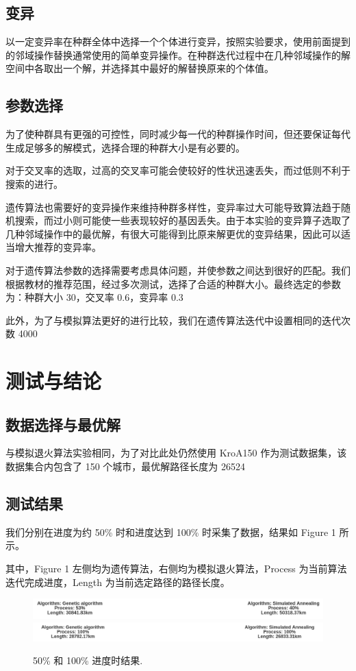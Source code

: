 \subsection{变异}

以一定变异率在种群全体中选择一个个体进行变异，按照实验要求，使用前面提到的邻域操作替换通常使用的简单变异操作。在种群迭代过程中在几种邻域操作的解空间中各取出一个解，并选择其中最好的解替换原来的个体值。

\subsection{参数选择}
为了使种群具有更强的可控性，同时减少每一代的种群操作时间，但还要保证每代生成足够多的解模式，选择合理的种群大小是有必要的。

对于交叉率的选取，过高的交叉率可能会使较好的性状迅速丢失，而过低则不利于搜索的进行。

遗传算法也需要好的变异操作来维持种群多样性，变异率过大可能导致算法趋于随机搜索，而过小则可能使一些表现较好的基因丢失。由于本实验的变异算子选取了几种邻域操作中的最优解，有很大可能得到比原来解更优的变异结果，因此可以适当增大推荐的变异率。

对于遗传算法参数的选择需要考虑具体问题，并使参数之间达到很好的匹配。我们根据教材的推荐范围，经过多次测试，选择了合适的种群大小。最终选定的参数为：种群大小 30，交叉率 0.6，变异率 0.3

此外，为了与模拟算法更好的进行比较，我们在遗传算法迭代中设置相同的迭代次数 4000

\section{测试与结论}

\subsection{数据选择与最优解}
与模拟退火算法实验相同，为了对比此处仍然使用 KroA150 作为测试数据集，该数据集合内包含了 150 个城市，最优解路径长度为 26524 


\subsection{测试结果}
我们分别在进度为约 50\% 时和进度达到 100\% 时采集了数据，结果如 Figure 1 所示。

其中，Figure 1 左侧均为遗传算法，右侧均为模拟退火算法，Process 为当前算法迭代完成进度，Length 为当前选定路径的路径长度。

\begin{figure}
\centering
\includegraphics[width=\textwidth]{comphalf.png}
\includegraphics[width=\textwidth]{compfinal.png}
\caption{\label{fig:final}50\% 和 100\% 进度时结果.}
\end{figure}

